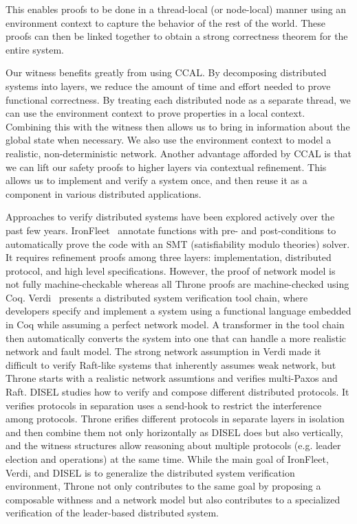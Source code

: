 This enables proofs to be done in a thread-local (or node-local) manner using an environment context to
capture the behavior of the rest of the world.
These proofs can then be linked together to obtain a strong correctness theorem for the entire system.

Our witness benefits greatly from using CCAL.
By decomposing distributed systems into layers, we reduce the amount of time and effort needed to
prove functional correctness.
By treating each distributed node as a separate thread, we can use the environment context to
prove properties in a local context.
Combining this with the witness then allows us to bring in information about the global state when necessary.
We also use the environment context to model a realistic, non-deterministic network.
Another advantage afforded by CCAL is that we can lift our safety proofs to higher layers via contextual refinement.
This allows us to implement and verify a system once, and then reuse it as a component in various distributed applications.


Approaches to verify distributed systems have been explored actively over the
past few years. IronFleet~\cite{ironfleet} annotate functions with pre- and
post-conditions to automatically prove the code with an SMT (satisfiability
modulo theories) solver. It requires refinement proofs among three layers:
implementation, distributed protocol, and high level specifications. However,
the proof of network model is not fully machine-checkable whereas all Throne
proofs are machine-checked using Coq.
Verdi~\cite{verdi} presents a distributed system
verification tool chain, where developers specify and implement a system using
a functional language embedded in Coq while assuming a perfect network model.
A transformer in the tool chain then automatically converts the system into one
that can handle a more realistic network and fault model. The strong network
assumption in Verdi made it difficult to verify Raft-like systems that
inherently assumes weak network, but Throne starts with a realistic network
assumtions and verifies multi-Paxos and Raft.
DISEL studies how to verify and compose different distributed protocols.
It verifies protocols in separation uses a send-hook to restrict the
interference among protocols.  Throne erifies different protocols in
separate layers in isolation and then combine them not only horizontally
as DISEL does but also vertically, and the witness structures allow reasoning
about multiple protocols (e.g. leader election and operations) at the same time.
While the main goal of IronFleet, Verdi, and DISEL is to generalize the
distributed system verification environment, Throne not only contributes to
the same goal by proposing a composable withness and a network model but also
contributes to a specialized verification of the leader-based distributed
system.